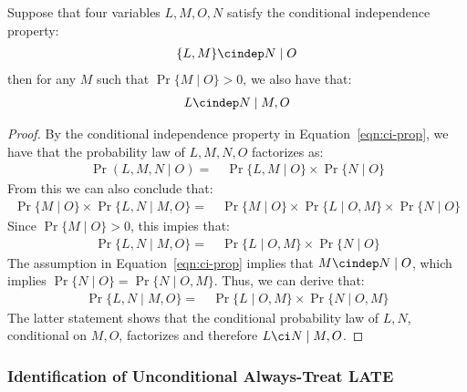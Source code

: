 \begin{lemma}\label{lem:alternative-ignorability}
    Suppose that four variables $L,M,O,N$ satisfy the conditional independence property:
    \begin{align}\label{eqn:ci-prop}
        \{L, M\} \cindep N \mid O
    \end{align}
    then for any $M$ such that $\Pr\{M \mid O\}>0$, we also have that:
    \begin{align}
        L \cindep N \mid M, O
    \end{align}
\end{lemma}
\begin{proof}
By the conditional independence property in Equation~\ref{eqn:ci-prop}, we have that the probability law of $L,M,N,O$ factorizes as:
\begin{align*}
    \Pr(L,M,N \mid O)=~&
  \Pr\{L,M \mid O\}\times \Pr\{N\mid O\}
\end{align*}
From this we can also conclude that:
\begin{align*}
\Pr\{ M \mid O \} \times \Pr\{ L,N  \mid M,O \}
=~& \Pr\{M\mid O\}\times \Pr\{L\mid O, M\}\times \Pr\{N\mid O\}
\end{align*}
Since $\Pr\{M\mid O\} > 0$, this impies that:
\begin{align*}
\Pr\{ L,N  \mid M,O \}
=~& \Pr\{L\mid O, M\}\times \Pr\{N\mid O\}
\end{align*}
The assumption in Equation~\ref{eqn:ci-prop} implies that $M\cindep N \mid O$, which implies $\Pr\{N\mid O\} = \Pr\{N\mid O, M\}$. Thus, we can derive that:
\begin{align*}
\Pr\{ L,N  \mid M,O \}
=~& \Pr\{L\mid O, M\}\times \Pr\{N\mid O, M\}
\end{align*}
The latter statement shows that the conditional probability law of $L, N$, conditional on $M,O$, factorizes and therefore $L\ci N \mid M, O$.
\end{proof}

\subsubsection{Identification of Unconditional Always-Treat LATE}

